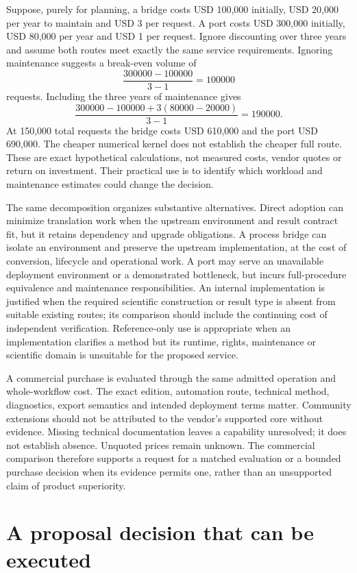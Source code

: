 Suppose, purely for planning, a bridge costs USD 100,000 initially, USD 20,000
per year to maintain and USD 3 per request. A port costs USD 300,000 initially,
USD 80,000 per year and USD 1 per request. Ignore discounting over three years
and assume both routes meet exactly the same service requirements. Ignoring
maintenance suggests a break-even volume of
\[
 \frac{300000-100000}{3-1}=100000
\]
requests. Including the three years of maintenance gives
\[
 \frac{300000-100000+3(80000-20000)}{3-1}=190000.
\]
At 150,000 total requests the bridge costs USD 610,000 and the port USD
690,000. The cheaper numerical kernel does not establish the cheaper full
route. These are exact hypothetical calculations, not measured costs, vendor
quotes or return on investment. Their practical use is to identify which
workload and maintenance estimates could change the decision.
\citep{exec16_s10_exact}

The same decomposition organizes substantive alternatives. Direct adoption
can minimize translation work when the upstream environment and result contract
fit, but it retains dependency and upgrade obligations. A process bridge can
isolate an environment and preserve the upstream implementation, at the cost
of conversion, lifecycle and operational work. A port may serve an unavailable
deployment environment or a demonstrated bottleneck, but incurs full-procedure
equivalence and maintenance responsibilities. An internal implementation is
justified when the required scientific construction or result type is absent
from suitable existing routes; its comparison should include the continuing
cost of independent verification. Reference-only use is appropriate when an
implementation clarifies a method but its runtime, rights, maintenance or
scientific domain is unsuitable for the proposed service.

A commercial purchase is evaluated through the same admitted operation and
whole-workflow cost. The exact edition, automation route, technical method,
diagnostics, export semantics and intended deployment terms matter. Community
extensions should not be attributed to the vendor's supported core without
evidence. Missing technical documentation leaves a capability unresolved; it
does not establish absence. Unquoted prices remain unknown. The commercial
comparison therefore supports a request for a matched evaluation or a bounded
purchase decision when its evidence permits one, rather than an unsupported
claim of product superiority.
\citep{exec16_s10_design}

\section{A proposal decision that can be executed}

